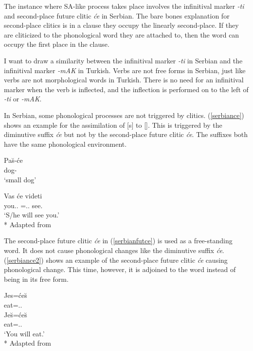 The instance where SA-like process takes place involves the infinitival marker \textit{-ti} and second-place future clitic \textit{\'{c}e} in Serbian. The bare bones explanation for second-place clitics is in a clause they occupy the linearly second-place. If they are cliticized to the phonological word they are attached to, then the word can occupy the first place in the clause.

I want to draw a similarity between the infinitival marker \textit{-ti} in Serbian and the infinitival marker \textit{-mAK} in Turkish. Verbs are not free forms in Serbian, just like verbs are not morphological words in Turkish. There is no need for an infinitival marker when the verb is inflected, and the inflection is performed on to the left of \textit{-ti} or \textit{-mAK}.

In Serbian, some phonological processes are not triggered by clitics. (\ref{serbiance}) shows an example for the assimilation of [s] to [\textesh]. This is  triggered by the diminutive suffix \textit{\'{c}e} but not by the second-place future clitic \textit{\'{c}e}. The suffixes both have the same phonological environment.

\begin{exe}
    \ex \label{serbiance}
    \begin{xlist}
        \ex \gll Pa\u{s}-\'{c}e \\ 
        dog-{\Dim} \\
        \glt `small dog'
        
        \ex \label{serbianfutce} \gll Vas \'{c}e videti \\ 
        you.{\Pl}.{\Acc} ={\Aux}.{\Tsg}.{\Fut} see.{\Inf} \\
        \glt `S/he will see you.'\\*
        \hfill Adapted from \cite{despic2017suspended}
    \end{xlist}
\end{exe}

The second-place future clitic \textit{\'{c}e} in (\ref{serbianfutce}) is used as a free-standing word. It does not cause phonological changes like the diminutive suffix \textit{\'{c}e}. (\ref{serbiance2}) shows an example of the second-place future clitic \textit{\'{c}e} causing phonological change. This time, however, it is adjoined to the word instead of being in its free form.

\begin{exe}
    \ex \label{serbiance2}
    \begin{xlist}
        \ex \gll *Jes=\'{c}e\u{s} \\ 
        eat={\Aux}.{\Ssg}.{\Fut} \\
    
        \ex \gll Je\u{s}=\'{c}e\u{s} \\ 
        eat={\Aux}.{\Ssg}.{\Fut} \\
        \glt `You will eat.'\\*
        \hfill Adapted from \cite{despic2017suspended}
    \end{xlist}
\end{exe}


